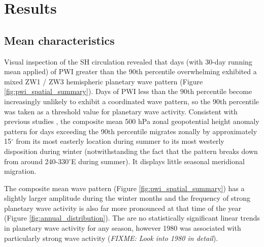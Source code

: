 \section{Results}

\subsection{Mean characteristics}

Visual inspection of the SH circulation revealed that days (with 30-day running mean applied) of PWI greater than the 90th percentile overwhelming exhibited a mixed ZW1 / ZW3 hemispheric planetary wave pattern (Figure \ref{fig:pwi_spatial_summary}). Days of PWI less than the 90th percentile become increasingly unlikely to exhibit a coordinated wave pattern, so the 90th percentile was taken as a threshold value for planetary wave activity. Consistent with previous studies \citep{vanLoon1984,Mo1985}, the composite mean 500 hPa zonal geopotential height anomaly pattern for days exceeding the 90th percentile migrates zonally by approximately 15$^{\circ}$ from its most easterly location during summer to its most westerly disposition during winter (notwithstanding the fact that the pattern breaks down from around 240-330$^{\circ}$E during summer). It displays little seasonal meridional migration.

The composite mean wave pattern (Figure \ref{fig:pwi_spatial_summary}) has a slightly larger amplitude during the winter months and the frequency of strong planetary wave activity is also far more pronounced at that time of the year (Figure \ref{fig:annual_distribution}). The are no statistically significant linear trends in planetary wave activity for any season, however 1980 was associated with particularly strong wave activity (\textit{FIXME: Look into 1980 in detail}).

